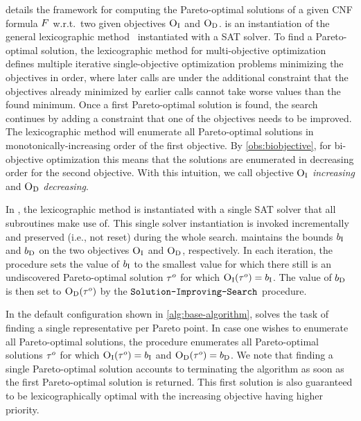  details the \algname{} framework for computing the Pareto-optimal solutions of a given CNF formula $F$ w.r.t.\ two given objectives $\textsc{O}_{\text{I}}$ and $\textsc{O}_{\text{D}}$.
\algname{} is an instantiation of the general lexicographic method~\autocite{survey} instantiated with a SAT solver.
To find a Pareto-optimal solution, the lexicographic method for multi-objective optimization defines multiple iterative single-objective optimization problems minimizing the objectives in order, where later calls are under the additional constraint that the objectives already minimized by earlier calls cannot take worse values than the found minimum.
Once a first Pareto-optimal solution is found, the search continues by adding a constraint that one of the objectives needs to be improved.
The lexicographic method will enumerate all Pareto-optimal solutions in monotonically-increasing order of the first objective.
By \cref{obs:biobjective}, for bi-objective optimization this means that the solutions are enumerated in decreasing order for the second objective.
With this intuition, we call objective $\textsc{O}_{\text{I}}$ \emph{increasing} and $\textsc{O}_{\text{D}}$ \emph{decreasing}.

In \algname{}, the lexicographic method is instantiated with a single SAT solver that all subroutines make use of.
This single solver instantiation is invoked incrementally and preserved (i.e., not reset) during the whole search. 
\algname{} maintains the bounds $b_{\text{I}}$ and $b_{\text{D}}$ on the two objectives $\textsc{O}_{\text{I}}$ and $\textsc{O}_{\text{D}}$, respectively.
In each iteration, the \Min{} procedure sets the value of $b_{\text{I}}$ to the smallest value for which there still is an undiscovered Pareto-optimal solution $\tau^o$ for which $\textsc{O}_{\text{I}}(\tau^o) = b_{\text{I}}$.
The value of $b_{\text{D}}$ is then set to $\textsc{O}_{\text{D}}(\tau^o)$ by the $\texttt{Solution-\allowbreak{}Improving-\allowbreak{}Search}$ procedure.

In the default configuration shown in \cref{alg:base-algorithm}, \algname{} solves the task of finding a single representative per Pareto point.
In case one wishes to enumerate all Pareto-optimal solutions, the \E{} procedure enumerates all Pareto-optimal solutions $\tau^o$ for which $\textsc{O}_{\text{I}}(\tau^o) = b_{\text{I}}$ and $\textsc{O}_{\text{D}}(\tau^o) = b_{\text{D}}$.
We note that finding a single Pareto-optimal solution accounts to terminating the algorithm as soon as the first Pareto-optimal solution is returned.
This first solution is also guaranteed to be lexicographically optimal with the increasing objective having higher priority.

